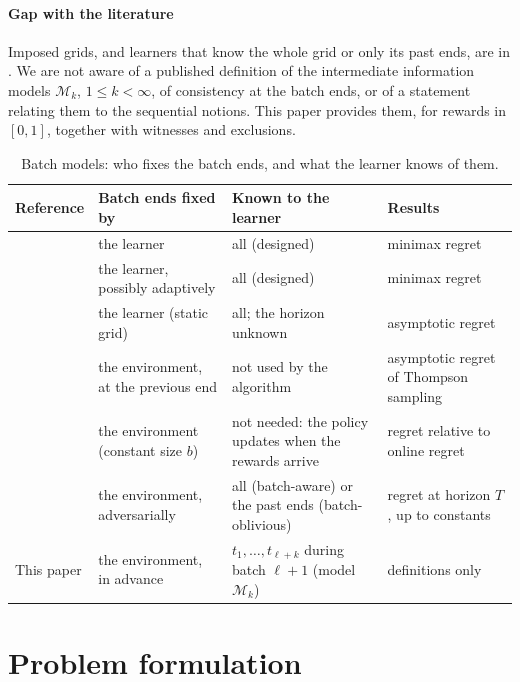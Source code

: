 \documentclass[11pt]{article}
\newcommand{\1}{\mathbf{1}}
\begin{document}
\paragraph{Gap with the literature} Imposed grids, and learners that know the whole grid or only
its past ends, are in \citet{QW26}. We are not aware of a published definition of the intermediate
information models $\mathcal M_k$, $1\le k<\infty$, of consistency at the batch ends, or of a
statement relating them to the sequential notions. This paper provides them, for rewards in
$[0,1]$, together with witnesses and exclusions.

\begin{table}[t]
\centering
\caption{Batch models: who fixes the batch ends, and what the learner knows of them.}\label{tab:comparison}
\begin{tabular}{@{}p{}p{}p{}p{}@{}}
\toprule
Reference & Batch ends fixed by & Known to the learner & Results \\
\midrule
\citet{PRCS16} & the learner & all (designed) & minimax regret \\
\citet{GHRZ19} & the learner, possibly adaptively & all (designed) & minimax regret \\
\citet{JTXHXG21} & the learner (static grid) & all; the horizon unknown & asymptotic regret \\
\citet{KO21b} & the environment, at the previous end & not used by the algorithm & asymptotic regret of Thompson sampling \\
\citet{PGPK21} & the environment (constant size $b$) & not needed: the policy updates when the rewards arrive & regret relative to online regret \\
\citet{QW26} & the environment, adversarially & all (batch-aware) or the past ends (batch-oblivious) & regret at horizon $T$, up to constants \\
This paper & the environment, in advance & $t_1,\dots,t_{\ell+k}$ during batch $\ell+1$ (model $\mathcal M_k$) & definitions only \\
\bottomrule
\end{tabular}
\end{table}

\section{Problem formulation}\label{sec:setting}
\end{document}
